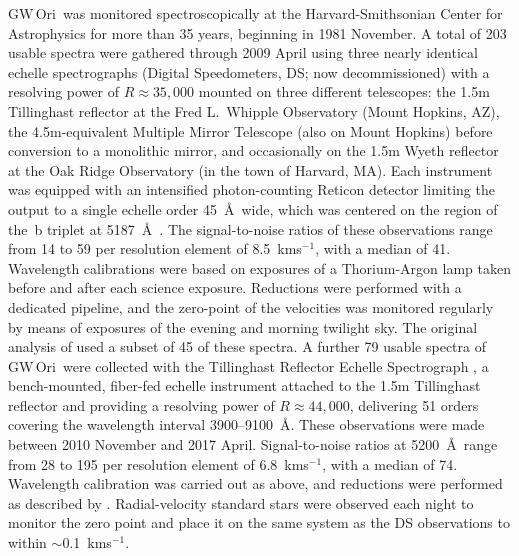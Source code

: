 \documentclass[twocolumn]{aastex61}
\newcommand\kms{\ifmmode{\rm km\thinspace s^{-1}}\else km\thinspace s$^{-1}$\fi}
\newcommand{\obj}{GW\,Ori}
\begin{document}
\obj\ was monitored spectroscopically at the Harvard-Smithsonian Center for Astrophysics for more than 35 years, beginning in 1981 November. A total of 203 usable spectra were gathered through 2009 April using three nearly identical echelle spectrographs (Digital Speedometers, DS; now decommissioned) with a resolving power of $R \approx 35,000$ mounted on three different telescopes: the 1.5m Tillinghast reflector at the Fred L.\ Whipple Observatory (Mount Hopkins, AZ), the 4.5m-equivalent Multiple Mirror Telescope (also on Mount Hopkins) before conversion to a monolithic mirror, and occasionally on the 1.5m Wyeth reflector at the Oak Ridge Observatory (in the town of Harvard, MA).  Each instrument was equipped with an intensified photon-counting Reticon detector limiting the output to a single echelle order 45~\AA\ wide, which was centered on the region of the \,b triplet at 5187~\AA\ \citep[see][]{latham92}. The signal-to-noise ratios of these observations range from 14 to 59 per resolution element of 8.5~\kms, with a median of 41. Wavelength calibrations were based on exposures of a Thorium-Argon lamp taken before and after each science exposure. Reductions were performed with a dedicated pipeline, and the zero-point of the velocities was monitored regularly by means of exposures of the evening and morning twilight sky. The original analysis of \cite{mathieu91} used a subset of 45 of these spectra. A further 79 usable spectra of \obj\ were collected with the Tillinghast Reflector Echelle Spectrograph \citep[TRES;][]{furesz08}, a bench-mounted, fiber-fed echelle instrument attached to the 1.5m Tillinghast reflector and providing a resolving power of $R \approx 44,000$, delivering 51 orders covering the wavelength interval 3900--9100~\AA. These observations were made between 2010 November and 2017 April.  Signal-to-noise ratios at 5200~\AA\ range from 28 to 195 per resolution element of 6.8~\kms, with a median of 74. Wavelength calibration was carried out as above, and reductions were performed as described by \cite{buchhave10}. Radial-velocity standard stars were observed each night to monitor the zero point and place it on the same system as the DS observations to within $\sim$0.1~\kms.
\end{document}
